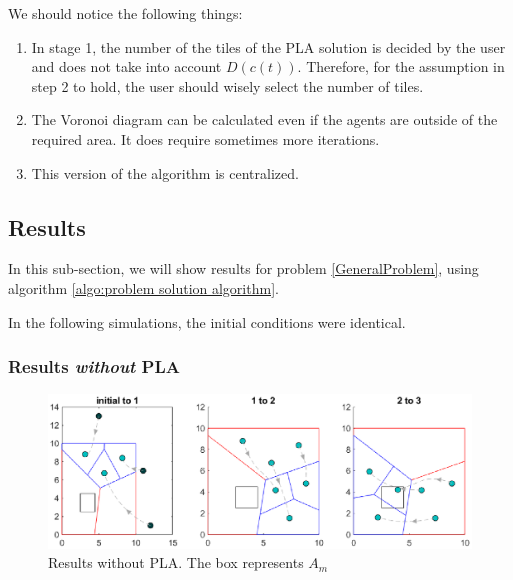 \documentclass{iacas}
\begin{document}
We should notice the following things:
\begin{enumerate}
\item In stage 1, the number of the tiles of the PLA solution is decided by the user and does not take into account $D(c(t))$. Therefore, for the assumption in step 2 to hold, the user should wisely select the number of tiles. 
\item The Voronoi diagram can be calculated even if the agents are outside of the required area. It does require sometimes more iterations.
\item This version of the algorithm is centralized.
\end{enumerate}


\subsection{Results}
In this sub-section, we will show results for problem \ref{GeneralProblem}, using algorithm \ref{algo:problem solution algorithm}.

In the following simulations, the initial conditions were identical.

\subsubsection{Results \emph{without} PLA}
\begin{figure}[H]
\includegraphics[scale=0.8]{figures/proposed-sol/results/sim1-3agents-3partitions-noPLA.eps}
\caption{Results without PLA. The box represents $A_m$}
\label{fig:results no PLA}
\end{figure}
\end{document}

